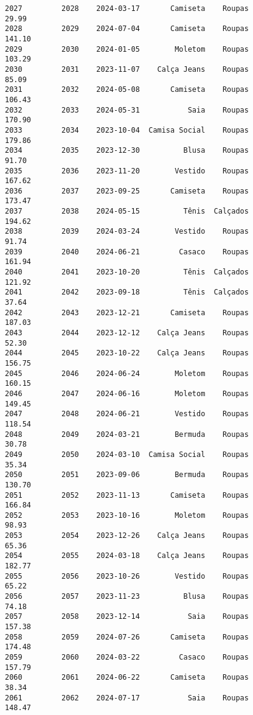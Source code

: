 \documentclass[11pt]{article}
\begin{document}
\begin{Verbatim}[commandchars=\\\{\}]
2027         2028    2024-03-17       Camiseta    Roupas           29.99   
2028         2029    2024-07-04       Camiseta    Roupas          141.10   
2029         2030    2024-01-05        Moletom    Roupas          103.29   
2030         2031    2023-11-07    Calça Jeans    Roupas           85.09   
2031         2032    2024-05-08       Camiseta    Roupas          106.43   
2032         2033    2024-05-31           Saia    Roupas          170.90   
2033         2034    2023-10-04  Camisa Social    Roupas          179.86   
2034         2035    2023-12-30          Blusa    Roupas           91.70   
2035         2036    2023-11-20        Vestido    Roupas          167.62   
2036         2037    2023-09-25       Camiseta    Roupas          173.47   
2037         2038    2024-05-15          Tênis  Calçados          194.62   
2038         2039    2024-03-24        Vestido    Roupas           91.74   
2039         2040    2024-06-21         Casaco    Roupas          161.94   
2040         2041    2023-10-20          Tênis  Calçados          121.92   
2041         2042    2023-09-18          Tênis  Calçados           37.64   
2042         2043    2023-12-21       Camiseta    Roupas          187.03   
2043         2044    2023-12-12    Calça Jeans    Roupas           52.30   
2044         2045    2023-10-22    Calça Jeans    Roupas          156.75   
2045         2046    2024-06-24        Moletom    Roupas          160.15   
2046         2047    2024-06-16        Moletom    Roupas          149.45   
2047         2048    2024-06-21        Vestido    Roupas          118.54   
2048         2049    2024-03-21        Bermuda    Roupas           30.78   
2049         2050    2024-03-10  Camisa Social    Roupas           35.34   
2050         2051    2023-09-06        Bermuda    Roupas          130.70   
2051         2052    2023-11-13       Camiseta    Roupas          166.84   
2052         2053    2023-10-16        Moletom    Roupas           98.93   
2053         2054    2023-12-26    Calça Jeans    Roupas           65.36   
2054         2055    2024-03-18    Calça Jeans    Roupas          182.77   
2055         2056    2023-10-26        Vestido    Roupas           65.22   
2056         2057    2023-11-23          Blusa    Roupas           74.18   
2057         2058    2023-12-14           Saia    Roupas          157.38   
2058         2059    2024-07-26       Camiseta    Roupas          174.48   
2059         2060    2024-03-22         Casaco    Roupas          157.79   
2060         2061    2024-06-22       Camiseta    Roupas           38.34   
2061         2062    2024-07-17           Saia    Roupas          148.47   

\end{Verbatim}
\end{document}
